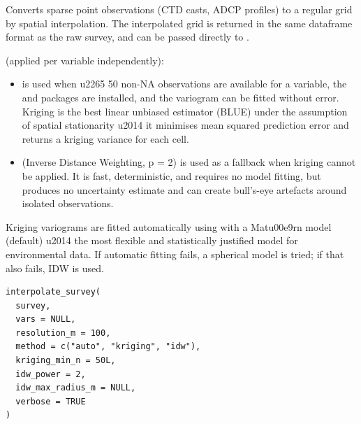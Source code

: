 \documentclass[a4paper]{book}
\begin{document}
\begin{Description}
Converts sparse point observations (CTD casts, ADCP profiles) to a regular
grid by spatial interpolation. The interpolated grid is returned in the same
dataframe format as the raw survey, and can be passed directly to
.

 (applied per variable independently):
\begin{itemize}

\item{}  is used when \bsl{}u2265 50 non-NA observations are available
for a variable, the  and  packages are installed, and the
variogram can be fitted without error. Kriging is the best linear
unbiased estimator (BLUE) under the assumption of spatial stationarity \bsl{}u2014
it minimises mean squared prediction error and returns a kriging variance
for each cell.
\item{}  (Inverse Distance Weighting, p = 2) is used as a fallback when
kriging cannot be applied. It is fast, deterministic, and requires no
model fitting, but produces no uncertainty estimate and can create
bull's-eye artefacts around isolated observations.

\end{itemize}


Kriging variograms are fitted automatically using 
with a Mat\bsl{}u00e9rn model (default) \bsl{}u2014 the most flexible and statistically
justified model for environmental data. If automatic fitting fails, a
spherical model is tried; if that also fails, IDW is used.
\end{Description}
%
\begin{Usage}
\begin{verbatim}
interpolate_survey(
  survey,
  vars = NULL,
  resolution_m = 100,
  method = c("auto", "kriging", "idw"),
  kriging_min_n = 50L,
  idw_power = 2,
  idw_max_radius_m = NULL,
  verbose = TRUE
)
\end{verbatim}
\end{Usage}
%
\end{document}
